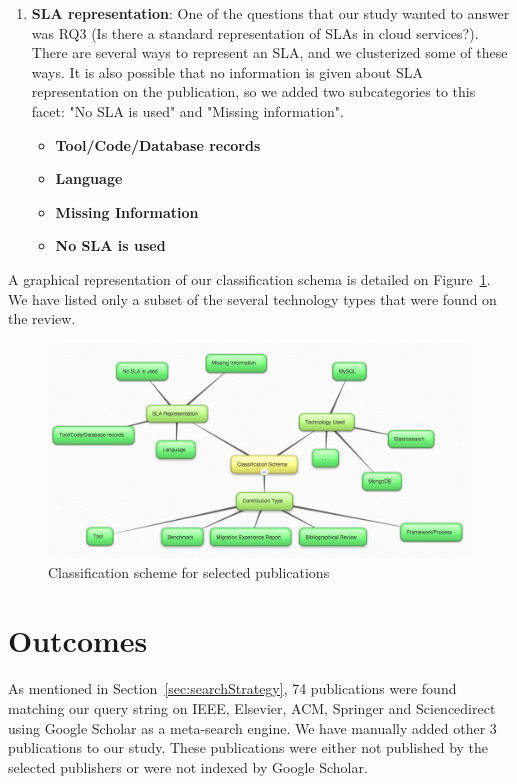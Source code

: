 \documentclass{article}
\begin{document}
\begin{enumerate}
    \item \textbf{SLA representation}: One of the questions that our study wanted to answer was RQ3 (Is there a standard representation of SLAs in cloud services?). There are several ways to represent an SLA, and we clusterized some of these ways. It is also possible that no information is given about SLA representation on the publication, so we added two subcategories to this facet: "No SLA is used" and "Missing information".  
    \begin{itemize}
      \item \textbf{Tool/Code/Database records}
      \item \textbf{Language}
      \item \textbf{Missing Information}
      \item \textbf{No SLA is used}
    \end{itemize}  
\end{enumerate}

A graphical representation of our classification schema is detailed on Figure~\ref{fig:classificationSchema}. We have listed only a subset of the several technology types that were found on the review.

\begin{figure}[!h]
\centering
\includegraphics[width=130mm]{classificationSchema.png}
\caption{Classification scheme for selected publications \label{fig:classificationSchema}}
\end{figure}



\section{Outcomes}
\label{sec:outcomes}

As mentioned in Section~\ref{sec:searchStrategy}, 74 publications were found matching our query string on IEEE, Elsevier, ACM, Springer and Sciencedirect using Google Scholar as a meta-search engine. We have manually added other 3 publications to our study. These publications were either not published by the selected publishers or were not indexed by Google Scholar. 
\end{document}
